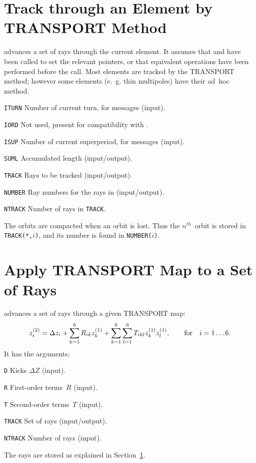 \section{Track through an Element by TRANSPORT Method}
\label{TTELEM}
advances a set of rays through the current element.
It assumes that  and  have been called
to set the relevant pointers,
or that equivalent operations have been performed before the call.
Most elements are tracked by the TRANSPORT method;
however some elements (e.~g. thin multipoles) have their ad~hoc method.
\begin{mylist}
\item[\tt ITURN]
Number of current turn, for messages (input).
\item[\tt IORD]
Not used, present for compatibility with .
\item[\tt ISUP]
Number of current superperiod, for messages (input).
\item[\tt SUML]
Accumulated length (input/output).
\item[\tt TRACK]
Rays to be tracked (input/output).
\item[\tt NUMBER]
Ray numbers for the rays in  (input/output).
\item[\tt NTRACK]
Number of rays in {\tt TRACK}.
\end{mylist}
The orbits are compacted when an orbit is lost.
Thus the $n^{th}$~orbit is stored in {\tt TRACK(*,$i$)},
and its number is found in {\tt NUMBER($i$)}.

\section{Apply TRANSPORT Map to a Set of Rays}
\label{TTTRAK}
advances a set of rays through a given TRANSPORT map:
\[
z^{(2)}_i = \Delta z_i + \sum_{k=1}^6 R_{ik} z^{(1)}_k
          + \sum_{k=1}^6 \sum_{l=1}^6 T_{ikl} z^{(1)}_k z^{(1)}_l,
          \qquad {\rm for} \quad i = 1 \ldots 6.
\]
It has the arguments:
\begin{mylist}
\item[\tt D]
Kicks $\Delta Z$ (input).
\item[\tt R]
First-order terms~$R$ (input).
\item[\tt T]
Second-order terms~$T$ (input).
\item[\tt TRACK]
Set of rays (input/output).
\item[\tt NTRACK]
Number of rays (input).
\end{mylist}
The rays are stored as explained in Section~\ref{TTELEM}.

